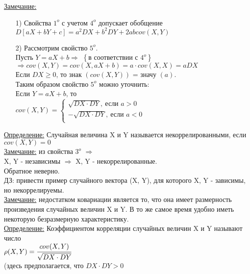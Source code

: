 \underline{Замечание:}\\
\begin{enumerate}
	\item[1)] Свойства $1^o$ с учетом $4^o$ допускает обобщение\\
	$D[aX + bY + c] = a^2 DX + b^2 DY + 2ab cov(X, Y)$\\
	
	\item[2)] Рассмотрим свойство $5^o$.\\
	Пусть $Y = aX + b \Rightarrow$ $\left\{\text{в соответствии с } 4^o\right\}$ $\Rightarrow cov(X, Y) = cov(X, aX + b) = a \cdot cov(X, X) = a DX$\\
	Если $DX \geqslant 0$, то знак $(cov(X, Y))$ =  значу $(a)$.\\
	Таким образом свойство $5^o$ можно уточнить:\\
	Если $Y = aX + b$, то\\
	$cov(X, Y) = 
	\begin{cases}
		\sqrt{DX \cdot DY}, \ \text{если } a > 0\\
		-\sqrt{DX \cdot DY}, \ \text{если } a < 0\\
	\end{cases}$
\end{enumerate}


\underline{Определение:} Случайная величина X и Y называется некоррелированными, если\\
$cov(X, Y) = 0$\\


\underline{Замечание:} из свойства $3^o$ $\Rightarrow$\\
X, Y - независимы $\Rightarrow$ X, Y - некоррелированные.\\
Обратное неверно.\\

ДЗ: привести пример случайного вектора (X, Y), для которого X, Y - зависимы, но некоррелируемы.\\


\underline{Замечание:} недостатком ковариации является то, что она имеет размерность произведения случайных величин X и Y. В то же самое время удобно иметь некоторую безразмерную характеристику.\\


\underline{Определение:} Коэффициентом корреляции случайных величин X и Y называют число\\
$\rho(X, Y) = \cfrac{cov(X, Y)}{\sqrt{DX \cdot DY}}$\\
(здесь предполагается, что $DX \cdot DY > 0$\\


